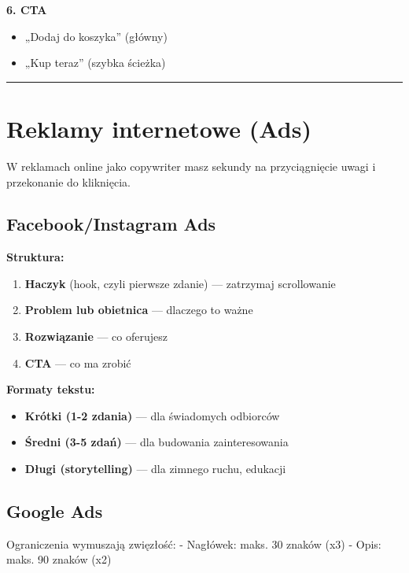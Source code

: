 \documentclass[
  12pt,
  a4paper,
  twoside,
  openright,
  12pt,
  DIV=12,
  BCOR=12mm]{scrbook}
\providecommand{\tightlist}{%
  \setlength{\itemsep}{0pt}\setlength{\parskip}{0pt}}\usepackage{longtable,booktabs,array}
\newcommand{\decoline}{%
  \begin{center}
    \textcolor{bordergray}{\rule{0.3\textwidth}{0.5pt}}
  \end{center}
}
\begin{document}
\textbf{6. CTA}

\begin{itemize}
\tightlist
\item
  „Dodaj do koszyka'' (główny)
\item
  „Kup teraz'' (szybka ścieżka)
\end{itemize}

\decoline

\section{Reklamy internetowe (Ads)}\label{reklamy-internetowe-ads}

W reklamach online jako copywriter masz sekundy na przyciągnięcie uwagi
i przekonanie do kliknięcia.

\subsection{Facebook/Instagram Ads}\label{facebookinstagram-ads}

\textbf{Struktura:}

\begin{enumerate}
\def\labelenumi{\arabic{enumi}.}
\tightlist
\item
  \textbf{Haczyk} (hook, czyli pierwsze zdanie) --- zatrzymaj
  scrollowanie
\item
  \textbf{Problem lub obietnica} --- dlaczego to ważne
\item
  \textbf{Rozwiązanie} --- co oferujesz
\item
  \textbf{CTA} --- co ma zrobić
\end{enumerate}

\textbf{Formaty tekstu:}

\begin{itemize}
\tightlist
\item
  \textbf{Krótki (1-2 zdania)} --- dla świadomych odbiorców
\item
  \textbf{Średni (3-5 zdań)} --- dla budowania zainteresowania
\item
  \textbf{Długi (storytelling)} --- dla zimnego ruchu, edukacji
\end{itemize}

\subsection{Google Ads}\label{google-ads}

Ograniczenia wymuszają zwięzłość: - Nagłówek: maks. 30 znaków (x3) -
Opis: maks. 90 znaków (x2)
\end{document}
